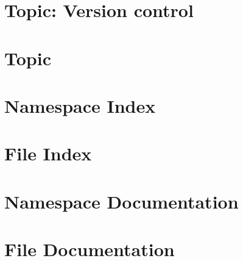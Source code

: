 \documentclass[twoside]{book}
\newcommand{\+}{\discretionary{\mbox{\scriptsize$\hookleftarrow$}}{}{}}
\newcommand{\clearemptydoublepage}{%
  \newpage{\pagestyle{empty}\cleardoublepage}%
}
\begin{document}
\chapter{Topic\+: Version control}
\label{md_markdown_topic_version_control}

\chapter{Topic}
\label{md_markdown_topics}

\chapter{Namespace Index}

\chapter{File Index}

\chapter{Namespace Documentation}

\chapter{File Documentation}












































\backmatter
\newpage
{}
\clearemptydoublepage
{}
\printindex
\end{document}

